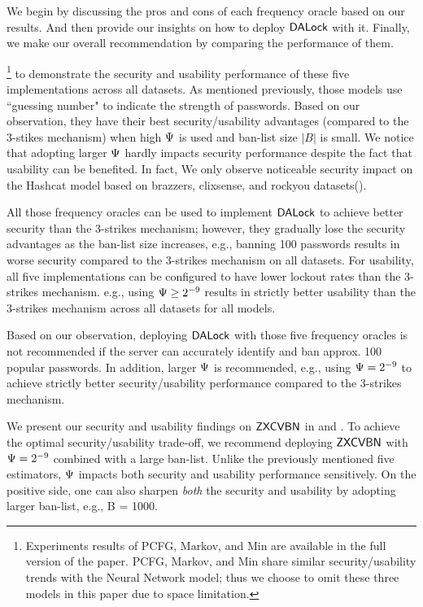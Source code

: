We begin by discussing the pros and cons of each frequency oracle based on our results. And then provide our insights on how to deploy $\mathsf{DALock}$ with it. Finally, we make our overall recommendation by comparing the performance of them.


\footnote{Experiments results of PCFG, Markov, and Min are available in the full version of the paper. PCFG, Markov, and Min share similar security/usability trends with the Neural Network model; thus we choose to omit these three models in this paper due to space limitation.  }   to  demonstrate the security and usability performance of these five implementations across all datasets. As mentioned previously, those models use ``guessing number" to indicate the strength of passwords. Based on our observation, they have their best security/usability advantages (compared to the 3-stikes mechanism) when high $\Psi$ is used and ban-list size $|B|$ is small. We notice that adopting larger $\Psi$ hardly impacts security performance despite the fact that usability can be benefited. In fact, We only observe noticeable security impact on the Hashcat model based on brazzers, clixsense, and rockyou datasets().

All those frequency oracles can be used to implement $\mathsf{DALock}$ to achieve better security than the 3-strikes mechanism; however, they gradually lose the security advantages as the ban-list size increases, e.g., banning 100 passwords results in worse security compared to the 3-strikes mechanism on all datasets. For usability, all five implementations can be configured to have lower lockout rates than the 3-strikes mechanism. e.g., using $\Psi \ge 2^{-9}$ results in strictly better usability than the 3-strikes mechanism across all datasets for all models. 

Based on our observation, deploying $\mathsf{DALock}$ with those five frequency oracles is not recommended if the server can accurately identify and ban approx. 100 popular passwords. In addition, larger $\Psi$ is recommended, e.g., using $\Psi = 2^{-9}$ to achieve strictly better security/usability performance compared to the 3-strikes mechanism.


 We present our security and usability findings on $\mathsf{ZXCVBN}$ in  and . To achieve the optimal security/usability trade-off, we recommend deploying $\mathsf{ZXCVBN}$ with $\Psi =2^{-9}$ combined with a large ban-list. Unlike the previously mentioned five estimators, $\Psi$ impacts both security and usability performance sensitively. On the positive side, one can also sharpen \textit{both} the security and usability by adopting larger ban-list, e.g., B = 1000.

